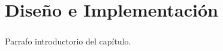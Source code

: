 \chapter{Diseño e Implementación}
\label{Chapter3}

\paragraph{} Parrafo introductorio del capítulo.
